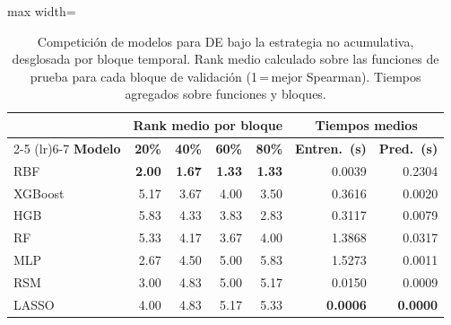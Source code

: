 \begin{table}[H]
    \centering
    \small
    \setlength{\tabcolsep}{4pt}
    \begin{adjustbox}{max width=\textwidth}
        \begin{tabular}{lrrrr|rr}
            \toprule
            \multicolumn{1}{l}{} & \multicolumn{4}{c}{\textbf{Rank medio por bloque}} & \multicolumn{2}{c}{\textbf{Tiempos medios}} \\
            \cmidrule(lr){2-5} \cmidrule(lr){6-7}
            \textbf{Modelo} & \textbf{20\%} & \textbf{40\%} & \textbf{60\%} & \textbf{80\%} & \textbf{Entren.\ (s)} & \textbf{Pred.\ (s)} \\
            \midrule
            RBF & \textbf{2.00} & \textbf{1.67} & \textbf{1.33} & \textbf{1.33} & 0.0039 & 0.2304 \\
            XGBoost & 5.17 & 3.67 & 4.00 & 3.50 & 0.3616 & 0.0020 \\
            HGB & 5.83 & 4.33 & 3.83 & 2.83 & 0.3117 & 0.0079 \\
            RF & 5.33 & 4.17 & 3.67 & 4.00 & 1.3868 & 0.0317 \\
            MLP & 2.67 & 4.50 & 5.00 & 5.83 & 1.5273 & 0.0011 \\
            RSM & 3.00 & 4.83 & 5.00 & 5.17 & 0.0150 & 0.0009 \\
            LASSO & 4.00 & 4.83 & 5.17 & 5.33 & \textbf{0.0006} & \textbf{0.0000} \\
            \bottomrule
        \end{tabular}
    \end{adjustbox}
    \caption{Competición de modelos para DE bajo la estrategia no acumulativa, desglosada por bloque temporal. Rank medio calculado sobre las funciones de prueba para cada bloque de validación (1\,=\,mejor Spearman). Tiempos agregados sobre funciones y bloques.}
    \label{tab:comparativa_modelos_bloques_de}
\end{table}
